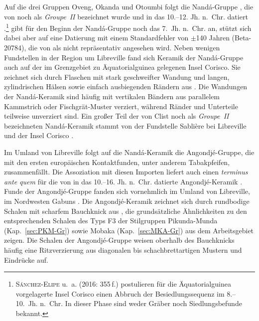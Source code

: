 Auf die drei Gruppen Oveng, Okanda und Otoumbi folgt die Nandá-Gruppe \parencite[300 Anm.~4, 338--340]{SanchezElipe.2015}, die von \textcite[628--631, 628 Abb.~7-68]{Clist.20042005} noch als \textit{Groupe~II} bezeichnet wurde und in das 10.--12. Jh. n.~Chr. datiert \parencite[357]{SanchezElipe.2016}.\footnote{\textsc{Sánchez-Elipe} u.~a. (2016: 355\,f.) postulieren für die Äquatorialguinea vorgelagerte Insel Corisco einen Abbruch der Besiedlungssequenz im 8.--10.~Jh. n.~Chr. In dieser Phase sind weder Gräber noch Siedlungsbefunde bekannt.} \textcite{Clist.20042005} gibt für den Beginn der Nandá-Gruppe noch das 7.~Jh. n.~Chr. an, stützt sich dabei aber auf eine Datierung mit einem Standardfehler von $\pm$140 Jahren (Beta-20784), die von \textcites[357]{SanchezElipe.2016} als nicht repräsentativ angesehen wird. Neben wenigen Fundstellen in der Region um Libreville \parencite[629 Abb.~7-69]{Clist.20042005} fand sich Keramik der Nandá-Gruppe auch auf der im Grenzgebiet zu Äquatorialguinea gelegenen Insel Corisco. Sie zeichnet sich durch Flaschen mit stark geschweifter Wandung und langen, zylindrischen Hälsen sowie einfach ausbiegenden Rändern aus \parencites[Abb.~\ref{fig:Gabon_Sequence}.10--11; ebd. 603--611 Abb.~7-47--7-55;][222 Abb.~6.41, 303--315 Abb.~7.46--7.58]{SanchezElipe.2015}[137 Abb.~18]{GonzalesRuibal.2012}. Die Wandungen der Nandá-Keramik sind häufig mit vertikalen Bändern aus parallelem Kammstrich oder Fischgrät-Muster verziert, während Ränder und Unterteile teilweise unverziert sind. Ein großer Teil der von Clist noch als \textit{Groupe~II} bezeichneten Nandá-Keramik stammt von der Fundstelle Sablière bei Libreville \parencite[600--614]{Clist.20042005} und der Insel Corisco \parencites{GonzalezRuibal.2011}{GonzalesRuibal.2012}.

Im Umland von Libreville folgt auf die Nandá-Keramik die Angondjé-Gruppe, die mit den ersten europäischen Kontaktfunden, unter anderem Tabakpfeifen, zusammenfällt. Die Assoziation mit diesen Importen liefert auch einen \textit{terminus ante quem} für die von \textcite[691]{Clist.20042005} in das 10.--16. Jh. n.~Chr. datierte Angondjé-Keramik \parencites[siehe][224]{SanchezElipe.2015}[357\,f.]{SanchezElipe.2016}. Funde der Angondjé-Gruppe fanden sich vornehmlich im Umland von Libreville, im Nordwesten Gabuns \parencite[692 Abb.~7-122]{Clist.20042005}. Die Angondjé-Keramik zeichnet sich durch rundbodige Schalen mit scharfem Bauchknick aus \parencite[Abb.~\ref{fig:Gabon_Sequence}.12--13; ebd. 645--649 Abb.~7.81--7.85; ][187 Abb.~6.20, 223--224 Abb.~6.42--6.43]{SanchezElipe.2015}, die grundsätzliche Ähnlichkeiten zu den entsprechenden Schalen des Typs F3 der Stilgruppen Pikunda-Munda (Kap.~\ref{sec:PKM-Gr}) sowie Mobaka (Kap.~\ref{sec:MKA-Gr}) aus dem Arbeitsgebiet zeigen. Die Schalen der Angondjé-Gruppe weisen oberhalb des Bauchknicks häufig eine Ritzverzierung aus diagonalen bis schachbrettartigen Mustern und Eindrücke auf. 